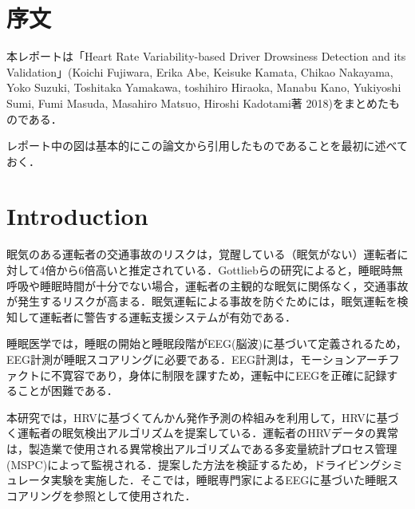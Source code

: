 \section{序文}
\label{sec:序文}

本レポートは「Heart Rate Variability-based Driver Drowsiness Detection and its Validation」(Koichi Fujiwara, Erika Abe, Keisuke Kamata, Chikao Nakayama, Yoko Suzuki, Toshitaka Yamakawa, toshihiro Hiraoka, Manabu Kano, Yukiyoshi Sumi, Fumi Masuda, Masahiro Matsuo, Hiroshi Kadotami著 2018)をまとめたものである．

レポート中の図は基本的にこの論文から引用したものであることを最初に述べておく．

\section{Introduction}
\label{sec:Introduction}
眠気のある運転者の交通事故のリスクは，覚醒している（眠気がない）運転者に対して4倍から6倍高いと推定されている．Gottliebらの研究によると，睡眠時無呼吸や睡眠時間が十分でない場合，運転者の主観的な眠気に関係なく，交通事故が発生するリスクが高まる\cite{gottlieb(2018)}．眠気運転による事故を防ぐためには，眠気運転を検知して運転者に警告する運転支援システムが有効である．

睡眠医学では，睡眠の開始と睡眠段階がEEG(脳波)に基づいて定義されるため，EEG計測が睡眠スコアリングに必要である．EEG計測は，モーションアーチファクトに不寛容であり，身体に制限を課すため，運転中にEEGを正確に記録することが困難である．

本研究では，HRVに基づくてんかん発作予測の枠組みを利用して，HRVに基づく運転者の眠気検出アルゴリズムを提案している．運転者のHRVデータの異常は，製造業で使用される異常検出アルゴリズムである多変量統計プロセス管理(MSPC)\cite{fujiwara(2015)}によって監視される．提案した方法を検証するため，ドライビングシミュレータ実験を実施した．そこでは，睡眠専門家によるEEGに基づいた睡眠スコアリングを参照として使用された．